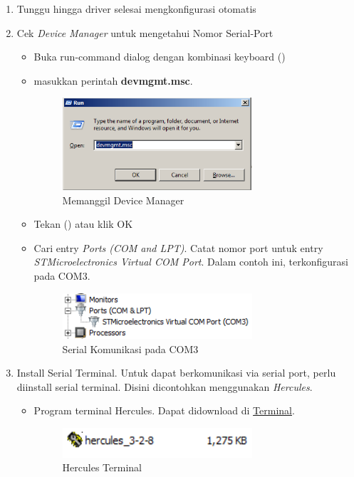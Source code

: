 \documentclass{article}
\begin{document}
\begin{enumerate}
		\item Tunggu hingga driver selesai mengkonfigurasi otomatis
		
		\item Cek \textit{Device Manager} untuk mengetahui Nomor Serial-Port
		\begin{itemize}
			\item Buka run-command dialog dengan kombinasi keyboard ()
			
			\item masukkan perintah \textbf{devmgmt.msc}.
			\begin{figure}[!ht]
				\centering
				\includegraphics[width=200pt]{images/software/devicemgr}
				\caption{Memanggil Device Manager}
			\end{figure}
			
			\item Tekan (\keys{\return}) atau klik OK
			
			\newpage
			\item Cari entry \textit{Ports (COM and LPT)}.
			Catat nomor port untuk entry \textit{STMicroelectronics Virtual COM Port}.
			Dalam contoh ini, terkonfigurasi pada COM3.
			
			\begin{figure}[!ht]
				\centering
				\includegraphics[width=200pt]{images/software/comport}
				\caption{Serial Komunikasi pada COM3}
			\end{figure}
		\end{itemize}
		
		
		\item Install Serial Terminal.
		Untuk dapat berkomunikasi via serial port, perlu diinstall serial terminal.
		Disini dicontohkan menggunakan \textit{Hercules}.
		
		\begin{itemize}
			\item Program terminal Hercules. Dapat didownload di \href{https://drive.google.com/drive/folders/1fgNPnGeSm20TrFfwmeCa4B24WIN_t_o_?usp=share_link}{Terminal}.
			\begin{figure}[!ht]
				\centering
				\includegraphics[width=200pt]{images/software/hercules}
				\caption{Hercules Terminal}
			\end{figure}
			

\end{itemize}
\end{enumerate}
\end{document}
